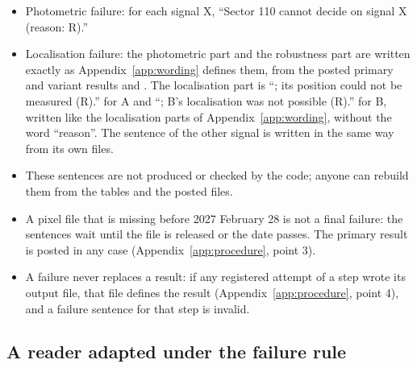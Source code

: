 \begin{itemize}
\item Photometric failure: for each signal X, ``Sector 110 cannot decide on signal X (reason: R).''
\item Localisation failure: the photometric part and the robustness part are written exactly as
  Appendix~\ref{app:wording} defines them, from the posted primary and variant results and
  . The localisation part is ``; its position could not be measured (R).'' for A
  and ``; B's localisation was not possible (R).'' for B, written like the localisation parts of
  Appendix~\ref{app:wording}, without the word ``reason''. The sentence of the other signal is written in the same way
  from its own files.
\item These sentences are not produced or checked by the code; anyone can rebuild them from the tables and the posted
  files.
\item A pixel file that is missing before 2027 February 28 is not a final failure: the sentences wait until the file is
  released or the date passes. The primary result is posted in any case (Appendix~\ref{app:procedure}, point 3).
\item A failure never replaces a result: if any registered attempt of a step wrote its output file, that file defines
  the result (Appendix~\ref{app:procedure}, point 4), and a failure sentence for that step is invalid.
\end{itemize}

\subsection{A reader adapted under the failure rule} \label{app:p6}

